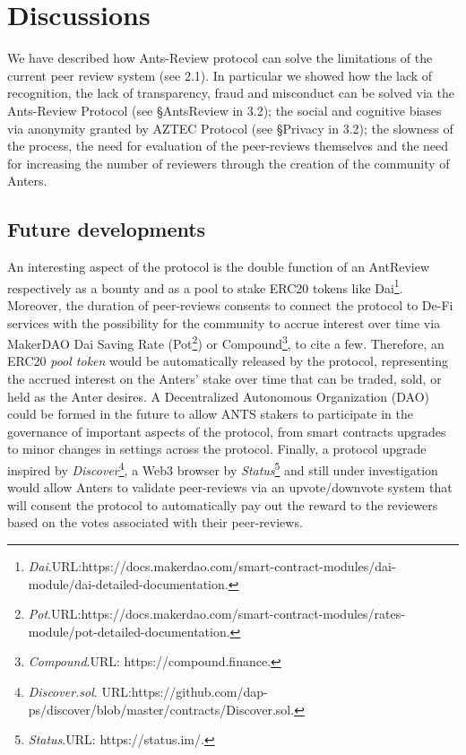 \documentclass[runningheads]{llncs}
\begin{document}
\section{Discussions}
We have described how Ants-Review protocol can solve the limitations of the current peer review system (see 2.1). In particular we showed how the lack of recognition, the lack of transparency, fraud and misconduct can be solved via the Ants-Review Protocol (see §AntsReview in 3.2); the social and cognitive biases via anonymity granted by AZTEC Protocol (see §Privacy in 3.2); the slowness of the process, the need for evaluation of the peer-reviews themselves and the need for increasing the number of reviewers through the creation of the community of Anters. 
\subsection{Future developments}
An interesting aspect of the protocol is the double function of an AntReview respectively as a bounty and as a pool to stake ERC20 tokens like Dai\footnote[15]{\emph{Dai}.\textsc{URL:}https://docs.makerdao.com/smart-contract-modules/dai-module/dai-detailed-documentation.}. Moreover, the duration of peer-reviews consents to connect the protocol to De-Fi services with the possibility for the community to accrue interest over time via MakerDAO Dai Saving Rate (Pot\footnote[16]{\emph{Pot}.\textsc{URL:}https://docs.makerdao.com/smart-contract-modules/rates-module/pot-detailed-documentation.}) or Compound\footnote[17]{\emph{Compound}.\textsc{URL:} https://compound.finance.}, to cite a few.
Therefore, an ERC20 \emph{pool token} would be automatically released by the protocol, representing the accrued interest on the Anters' stake over time that can be traded, sold, or held as the Anter desires.
A Decentralized Autonomous Organization (DAO) \cite{Wang-DAO,DAOContr} could be formed in the future to allow ANTS stakers to participate in the governance of important aspects of the protocol, from smart contracts upgrades to minor changes in settings across the protocol.
\newline Finally, a protocol upgrade inspired by \emph{Discover}\footnote[18]{\emph{Discover.sol}. \textsc{URL:}\newline https://github.com/dap-ps/discover/blob/master/contracts/Discover.sol.}, a Web3 browser by \emph{Status}\footnote[19]{\emph{Status}.\textsc{URL:} https://status.im/.} and still under investigation would allow Anters to validate peer-reviews via an upvote/downvote system that will consent the protocol to automatically pay out the reward to the reviewers based on the votes associated with their peer-reviews.
\end{document}
